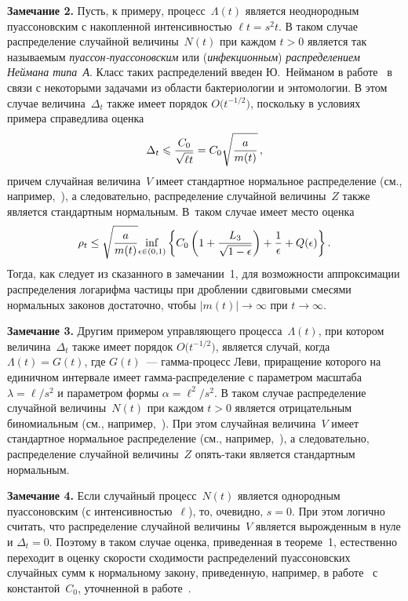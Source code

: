 \begin{multicols}{2}
\noindent
\textbf{Замечание 2.} Пусть, к примеру, процесс~$\Lambda(t)$ является
неоднородным пуассоновским с накопленной интенсивностью $\ell
t=s^2 t$. В таком случае распределение случайной величины~$N(t)$
при каждом $t>0$ является так называемым {\it
пуассон-пуас\-со\-нов\-ским} или ({\it инфекционным})
{\it распределением Неймана типа~А}. Класс таких распределений
введен Ю.~Нейманом в работе~\cite{15kk} в связи с некоторыми задачами из
области бактериологии и энтомологии. В этом случае величина~$\Delta_t$
также имеет порядок $O\big(t^{-1/2}\big)$, поскольку в
условиях примера справедлива оценка
$$
\Delta_t\leqslant\displaystyle\frac{\displaystyle C_0\mathstrut}{\displaystyle \sqrt{\ell t}\mathstrut}=C_0\sqrt{\displaystyle\frac{\displaystyle a\mathstrut}{\displaystyle m(t)\mathstrut}}\,,
$$
причем случайная величина~$V$ имеет стандартное нормальное
распределение (см., например,~\cite{11kk}), а следовательно,
распределение случайной величины~$Z$ также является стандартным
нормальным. В~таком случае имеет место оценка
$$
\rho_t \leq
\sqrt{\displaystyle\frac{\displaystyle a\mathstrut}{\displaystyle m(t)\mathstrut}}\!\inf_{\epsilon\in(0,1)}\left\{C_0\left(1+
\displaystyle\frac{\displaystyle L_3\mathstrut}{\displaystyle \sqrt{1-\epsilon}\mathstrut}\right)+\displaystyle\frac{\displaystyle 1\mathstrut}{\displaystyle \epsilon\mathstrut}+Q(\epsilon)\right\}.
$$
Тогда, как следует из сказанного в замечании~1, для
возможности аппроксимации распределения логарифма частицы при
дроблении сдвиговыми смесями нормальных законов достаточно, чтобы
$|m(t)|\longrightarrow \infty$ при $t\to\infty$.

\medskip

\noindent
\textbf{Замечание 3.} Другим примером управляющего процесса~$\Lambda(t)$,
при котором величина~$\Delta_t$ также имеет порядок
$O\big(t^{-1/2}\big)$, является случай, когда $\Lambda(t)=G(t)$,
где $G(t)$~--- гамма-процесс Леви, приращение которого на единичном
интервале имеет гамма-распределение с параметром масштаба
$\lambda=\ell/s^2$ и параметром формы $\alpha=\ell^2/s^2$. В таком
случае распределение случайной величины~$N(t)$ при
каждом $t>0$ является отрицательным биномиальным (см., например,~\cite{11kk}).
При этом случайная величина~$V$ имеет стандартное
нормальное распределение (см., например,~\cite{11kk}), а следовательно,
распределение случайной величины~$Z$ опять-таки является
стандартным нормальным.

\medskip

\noindent
\textbf{Замечание 4.} Если случайный процесс~$N(t)$ является
однородным пуассоновским (с ин\-тен\-сив\-ностью~$\ell$), то, очевидно,
$s=0$. При этом логично считать, что распределение случайной
величины~$V$ является вырожденным в нуле и $\Delta_t=0$. Поэтому в
таком случае оценка, приведенная в теореме~1, естественно
переходит в оценку скорости схо\-ди\-мости распределений пуассоновских
случайных сумм к нормальному закону, приведенную, например, в
работе~\cite{16kk} с константой~$C_0$, уточненной в работе~\cite{17kk}.


\end{multicols}
